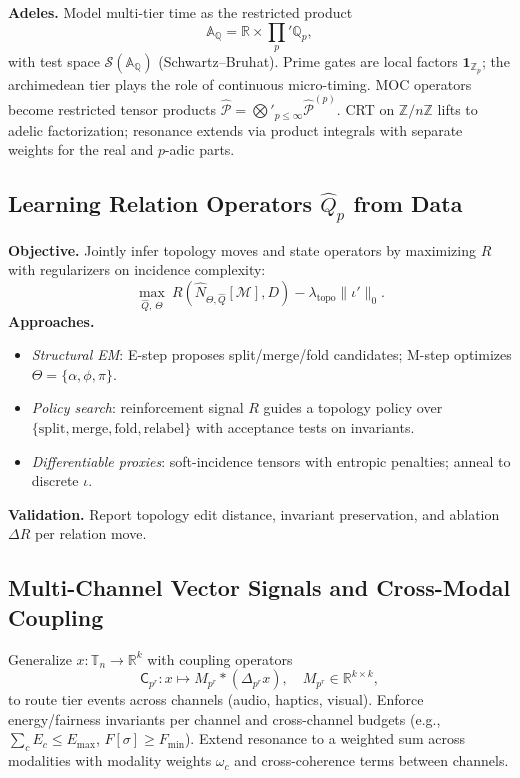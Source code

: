 \documentclass[12pt]{article}
\numberwithin{equation}{section}
\theoremstyle{plain}
\theoremstyle{definition}
\theoremstyle{remark}
\begin{document}
\textbf{Adeles.} Model multi-tier time as the restricted product
\[
\mathbb{A}_\mathbb{Q}=\mathbb{R}\times \prod_{p}{}' \mathbb{Q}_p,
\]
with test space $\mathcal{S}(\mathbb{A}_\mathbb{Q})$ (Schwartz–Bruhat). Prime gates are local factors $\mathbf{1}_{\mathbb{Z}_p}$; the archimedean tier plays the role of continuous micro-timing. MOC operators become restricted tensor products $\widehat{\mathcal{P}}=\bigotimes'_{p\le \infty}\widehat{\mathcal{P}}^{(p)}$. CRT on $\mathbb{Z}/n\mathbb{Z}$ lifts to adelic factorization; resonance extends via product integrals with separate weights for the real and $p$-adic parts.

\subsection*{Learning Relation Operators $\hat{Q}_p$ from Data}
\textbf{Objective.} Jointly infer topology moves and state operators by maximizing $R$ with regularizers on incidence complexity:
\[
\max_{\hat{Q},\,\Theta}\ R(\widehat{N}_{\Theta,\hat{Q}}[\mathcal{M}],D)-\lambda_{\mathrm{topo}}\|\iota'\|_0.
\]
\textbf{Approaches.}
\begin{itemize}
  \item \emph{Structural EM}: E-step proposes split/merge/fold candidates; M-step optimizes $\Theta=\{\alpha,\phi,\pi\}$.
  \item \emph{Policy search}: reinforcement signal $R$ guides a topology policy over $\{\mathrm{split},\mathrm{merge},\mathrm{fold},\mathrm{relabel}\}$ with acceptance tests on invariants.
  \item \emph{Differentiable proxies}: soft-incidence tensors with entropic penalties; anneal to discrete $\iota$.
\end{itemize}
\textbf{Validation.} Report topology edit distance, invariant preservation, and ablation $\Delta R$ per relation move.

\subsection*{Multi-Channel Vector Signals and Cross-Modal Coupling}
Generalize $x:\mathbb{T}_n\to\mathbb{R}^k$ with coupling operators
\[
\mathsf{C}_{p^r}: x \mapsto M_{p^r} * (\Delta_{p^r} x),\quad M_{p^r}\in\mathbb{R}^{k\times k},
\]
to route tier events across channels (audio, haptics, visual). Enforce energy/fairness invariants per channel and cross-channel budgets (e.g., $\sum_c E_c \le E_{\max}$, $F[\sigma]\ge F_{\min}$). Extend resonance to a weighted sum across modalities with modality weights $\omega_c$ and cross-coherence terms between channels.
\end{document}
